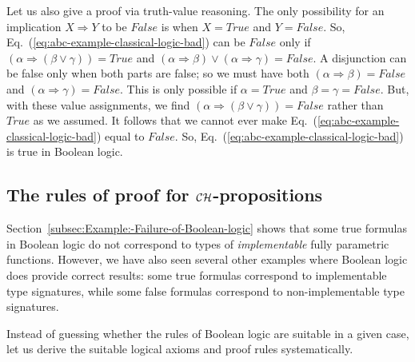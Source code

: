 Let us also give a proof via truth-value reasoning. The only possibility
for an implication $X\Rightarrow Y$ to be $False$ is when $X=True$
and $Y=False$. So, Eq.~(\ref{eq:abc-example-classical-logic-bad})
can be $False$ only if $\left(\alpha\Rightarrow(\beta\vee\gamma)\right)=True$
and $\left(\alpha\Rightarrow\beta\right)\vee\left(\alpha\Rightarrow\gamma\right)=False$.
A disjunction can be false only when both parts are false; so we must
have both $\left(\alpha\Rightarrow\beta\right)=False$ and $\left(\alpha\Rightarrow\gamma\right)=False$.
This is only possible if $\alpha=True$ and $\beta=\gamma=False$.
But, with these value assignments, we find $\left(\alpha\Rightarrow(\beta\vee\gamma)\right)=False$
rather than $True$ as we assumed. It follows that we cannot ever
make Eq.~(\ref{eq:abc-example-classical-logic-bad}) equal to $False$.
So, Eq.~(\ref{eq:abc-example-classical-logic-bad}) is true in Boolean
logic.

\subsection{The rules of proof for ${\cal CH}$-propositions\label{subsec:The-rules-of-proof}}

Section~\ref{subsec:Example:-Failure-of-Boolean-logic} shows that
some true formulas in Boolean logic do not correspond to types of
\emph{implementable} fully parametric functions. However, we have
also seen several other examples where Boolean logic does provide
correct results: some true formulas correspond to implementable type
signatures, while some false formulas correspond to non-implementable
type signatures.

Instead of guessing whether the rules of Boolean logic are suitable
in a given case, let us derive the suitable logical axioms and proof
rules systematically.

